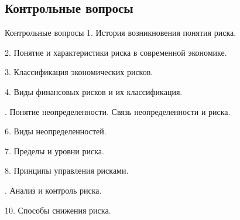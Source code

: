 \documentclass[_fin_decisions_lectures.tex]{subfiles}
\begin{document}
\subsection{Контрольные вопросы}
\begin{frame}[allowframebreaks]{Контрольные вопросы}
1. История возникновения понятия риска.

2. Понятие и характеристики риска в современной экономике. 

3. Классификация экономических рисков.

4. Виды финансовых рисков и их классификация.

. Понятие неопределенности. Связь неопределенности и риска.

6. Виды неопределенностей.

7. Пределы и уровни риска.

8. Принципы управления рисками.

. Анализ и контроль риска.

10. Способы снижения риска.
\end{frame}
\end{document}
